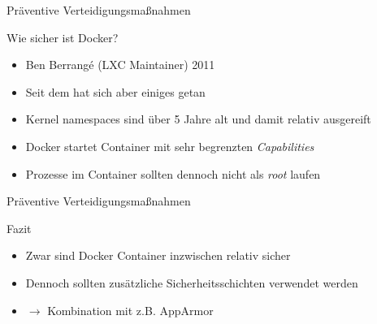 \begin{frame}{Präventive Verteidigungsmaßnahmen}
        \begin{block}{Wie sicher ist Docker?}
                \begin{itemize}[<+->]
                        \item {} Ben Berrangé (LXC Maintainer) 2011\footnotemark
                        \item Seit dem hat sich aber einiges getan
                        \item Kernel namespaces sind über 5 Jahre alt und damit relativ ausgereift
                        \item Docker startet Container mit sehr begrenzten \textit{Capabilities}
                        \item Prozesse im Container sollten dennoch nicht als \textit{root} laufen
                \end{itemize}
        \end{block}

\end{frame}

\begin{frame}{Präventive Verteidigungsmaßnahmen}
        \begin{block}{Fazit}
                \begin{itemize}[<+->]
                        \item Zwar sind Docker Container inzwischen relativ sicher
                        \item Dennoch sollten zusätzliche Sicherheitsschichten verwendet werden
                        \item $\rightarrow$ Kombination mit z.B. AppArmor
                \end{itemize}
        \end{block}
\end{frame}

